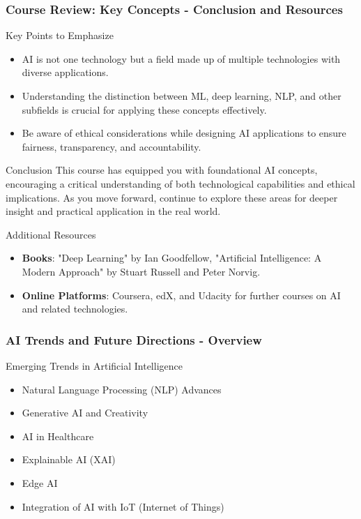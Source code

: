 \documentclass[aspectratio=169]{beamer}
\begin{document}
\begin{frame}[fragile]
    \frametitle{Course Review: Key Concepts - Conclusion and Resources}
    \begin{block}{Key Points to Emphasize}
        \begin{itemize}
            \item AI is not one technology but a field made up of multiple technologies with diverse applications.
            \item Understanding the distinction between ML, deep learning, NLP, and other subfields is crucial for applying these concepts effectively.
            \item Be aware of ethical considerations while designing AI applications to ensure fairness, transparency, and accountability.
        \end{itemize}
    \end{block}
    
    \begin{block}{Conclusion}
        This course has equipped you with foundational AI concepts, encouraging a critical understanding of both technological capabilities and ethical implications.
        As you move forward, continue to explore these areas for deeper insight and practical application in the real world.
    \end{block}
    
    \begin{block}{Additional Resources}
        \begin{itemize}
            \item \textbf{Books}: "Deep Learning" by Ian Goodfellow, "Artificial Intelligence: A Modern Approach" by Stuart Russell and Peter Norvig.
            \item \textbf{Online Platforms}: Coursera, edX, and Udacity for further courses on AI and related technologies.
        \end{itemize}
    \end{block}
\end{frame}

\begin{frame}[fragile]
    \frametitle{AI Trends and Future Directions - Overview}
    \begin{block}{Emerging Trends in Artificial Intelligence}
        \begin{itemize}
            \item Natural Language Processing (NLP) Advances
            \item Generative AI and Creativity
            \item AI in Healthcare
            \item Explainable AI (XAI)
            \item Edge AI
            \item Integration of AI with IoT (Internet of Things)
        \end{itemize}
    \end{block}
\end{frame}
\end{document}
